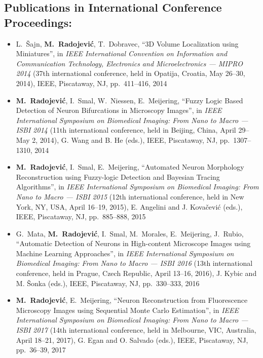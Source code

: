 \subsection*{Publications in International Conference Proceedings:}
\vspace{1ex}
\begin{itemize}
	\item L.~\v{S}ajn, \textbf{M.~Radojevi\'{c}}, T.~Dobravec, ``3D Volume Localization using Miniatures'', in \emph{IEEE International Convention on Information and Communication Technology, Electronics and Microelectronics --- MIPRO 2014} (37th international conference, held in Opatija, Croatia, May 26--30, 2014), IEEE, Piscataway, NJ, pp.~411--416, 2014

	\item \textbf{M.~Radojevi\'{c}}, I.~Smal, W.~Niessen, E.~Meijering, ``Fuzzy Logic Based Detection of Neuron Bifurcations in Microscopy Images'', in \emph{IEEE International Symposium on Biomedical Imaging: From Nano to Macro --- ISBI 2014} (11th international conference, held in Beijing, China, April 29--May 2, 2014), G. Wang and B. He (eds.), IEEE, Piscataway, NJ, pp.~1307--1310, 2014

	\item \textbf{M.~Radojevi\'{c}}, I.~Smal, E.~Meijering, ``Automated Neuron Morphology Reconstruction using Fuzzy-logic Detection and Bayesian Tracing Algorithms'', in \emph{IEEE International Symposium on Biomedical Imaging: From Nano to Macro --- ISBI 2015} (12th international conference, held in New York, NY, USA, April 16--19, 2015), E. Angelini and J. Kova\v{c}evi\'{c} (eds.), IEEE, Piscataway, NJ, pp.~885--888, 2015

	\item G.~Mata, \textbf{M.~Radojevi\'{c}}, I.~Smal, M.~Morales, E.~Meijering, J.~Rubio, ``Automatic Detection of Neurons in High-content Microscope Images using Machine Learning Approaches'', in \emph{IEEE International Symposium on Biomedical Imaging: From Nano to Macro --- ISBI 2016} (13th international conference, held in Prague, Czech Republic, April 13--16, 2016), J. Kybic and M. \v{S}onka (eds.), IEEE, Piscataway, NJ, pp.~330--333, 2016

	\item \textbf{M.~Radojevi\'{c}}, E.~Meijering, ``Neuron Reconstruction from Fluorescence Microscopy Images using Sequential Monte Carlo Estimation'', in \emph{IEEE International Symposium on Biomedical Imaging: From Nano to Macro --- ISBI 2017} (14th international conference, held in Melbourne, VIC, Australia, April 18--21, 2017), G. Egan and O. Salvado (eds.), IEEE, Piscataway, NJ, pp.~36--39, 2017 

\end{itemize}

\normalsize

